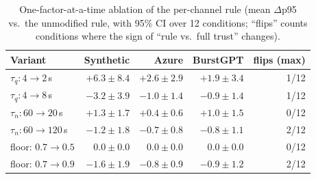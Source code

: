 \documentclass[11pt,a4paper]{article}
\begin{document}
\begin{table}[h]
\centering
\caption{One-factor-at-a-time ablation of the per-channel rule (mean $\Delta$p95 vs.\ the
unmodified rule, with 95\% CI over 12 conditions; “flips” counts conditions where the
sign of “rule vs.\ full trust” changes).}
\small
\setlength{\tabcolsep}{6pt}
\begin{tabular}{@{}lrrrr@{}}
\toprule
Variant & Synthetic & Azure & BurstGPT & flips (max) \\
\midrule
$\tau_q: 4\rightarrow2$\,s & $+6.3\pm8.4$ & $+2.6\pm2.9$ & $+1.9\pm3.4$ & 1/12 \\
$\tau_q: 4\rightarrow8$\,s & $-3.2\pm3.9$ & $-1.0\pm1.4$ & $-0.9\pm1.4$ & 1/12 \\
$\tau_n: 60\rightarrow20$\,s & $+1.3\pm1.7$ & $+0.4\pm0.6$ & $+1.0\pm1.5$ & 0/12 \\
$\tau_n: 60\rightarrow120$\,s & $-1.2\pm1.8$ & $-0.7\pm0.8$ & $-0.8\pm1.1$ & 2/12 \\
floor: $0.7\rightarrow0.5$ & $0.0\pm0.0$ & $0.0\pm0.0$ & $0.0\pm0.0$ & 0/12 \\
floor: $0.7\rightarrow0.9$ & $-1.6\pm1.9$ & $-0.8\pm0.9$ & $-0.9\pm1.2$ & 2/12 \\
\bottomrule
\end{tabular}
\end{table}
\end{document}
